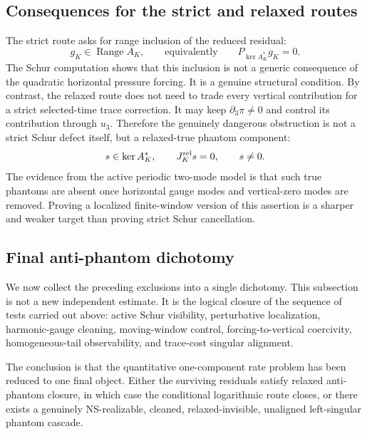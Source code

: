 \documentclass[11pt]{article}
\numberwithin{equation}{section}
\DeclareMathOperator{\Range}{Range}
\begin{document}
\subsection{Consequences for the strict and relaxed routes}

The strict route asks for range inclusion of the reduced residual:
\[
        g_K\in \Range A_K,
        \qquad\text{equivalently}\qquad
        P_{\ker A_K^*}g_K=0.
\]
The Schur computation shows that this inclusion is not a generic consequence of the quadratic horizontal pressure forcing.  It is a genuine structural condition.  By contrast, the relaxed route does not need to trade every vertical contribution for a strict selected-time trace correction.  It may keep \(\partial_3\pi\ne0\) and control its contribution through \(u_3\).  Therefore the genuinely dangerous obstruction is not a strict Schur defect itself, but a relaxed-true phantom component:
\begin{equation}\label{eq:true-phantom-summary}
        s\in\ker A_K^*,
        \qquad
        J_K^{\rm rel}s=0,
        \qquad
        s\ne0.
\end{equation}
The evidence from the active periodic two-mode model is that such true phantoms are absent once horizontal gauge modes and vertical-zero modes are removed.  Proving a localized finite-window version of this assertion is a sharper and weaker target than proving strict Schur cancellation.

\subsection{Final anti-phantom dichotomy}\label{subsec:final-anti-phantom-dichotomy}

We now collect the preceding exclusions into a single dichotomy.  This subsection is not a new
independent estimate.  It is the logical closure of the sequence of tests carried out above: active
Schur visibility, perturbative localization, harmonic-gauge cleaning, moving-window control,
forcing-to-vertical coercivity, homogeneous-tail observability, and trace-cost singular alignment.

The conclusion is that the quantitative one-component rate problem has been reduced to one final
object.  Either the surviving residuals satisfy relaxed anti-phantom closure, in which case the
conditional logarithmic route closes, or there exists a genuinely NS-realizable, cleaned,
relaxed-invisible, unaligned left-singular phantom cascade.
\end{document}
